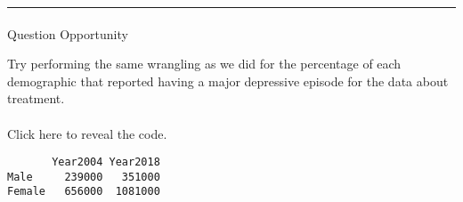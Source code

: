\documentclass[
]{article}
\newenvironment{Shaded}{\begin{snugshade}}{\end{snugshade}}
\newcommand{\DataTypeTok}[1]{\textcolor[rgb]{0.13,0.29,0.53}{#1}}
\newcommand{\DecValTok}[1]{\textcolor[rgb]{0.00,0.00,0.81}{#1}}
\newcommand{\FloatTok}[1]{\textcolor[rgb]{0.00,0.00,0.81}{#1}}
\newcommand{\KeywordTok}[1]{\textcolor[rgb]{0.13,0.29,0.53}{\textbf{#1}}}
\newcommand{\NormalTok}[1]{#1}
\newcommand{\OperatorTok}[1]{\textcolor[rgb]{0.81,0.36,0.00}{\textbf{#1}}}
\newcommand{\StringTok}[1]{\textcolor[rgb]{0.31,0.60,0.02}{#1}}
\begin{document}
\begin{center}\rule{0.5\linewidth}{0.5pt}\end{center}

\hypertarget{section-46}{%
\paragraph{}\label{section-46}}

Question Opportunity

Try performing the same wrangling as we did for the percentage of each
demographic that reported having a major depressive episode for the data
about treatment.

\hypertarget{section-47}{%
\paragraph{}\label{section-47}}

Click here to reveal the code.

\begin{Shaded}
\end{Shaded}

\begin{verbatim}
       Year2004 Year2018
Male     239000   351000
Female   656000  1081000
\end{verbatim}
\end{document}
